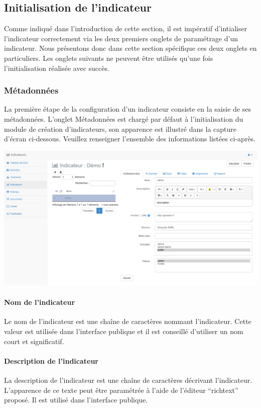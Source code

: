 \documentclass[letterpaper,10pt,french]{sphinxmanual}
\begin{document}
\subsection{Initialisation de l'indicateur}
\label{indicators/indicatorspanel:initialisation-de-l-indicateur}
Comme indiqué dans l'introduction de cette section, il est impératif
d'intialiser l'indicateur correctement via les deux premiers onglets de
paramétrage d'un indicateur. Nous présentons donc dans cette section
spécifique ces deux onglets en particuliers. Les onglets suivants ne
peuvent être utilisés qu'une fois l'initialisation réalisée avec succès.


\subsubsection{Métadonnées}
\label{indicators/indicatorspanel:metadonnees}
La première étape de la configuration d'un indicateur consiste en la
saisie de ses métadonnées. L'onglet Métadonnées est chargé par défaut
à l'initialisation du module de création d'indicateurs, son apparence
est illustré dans la capture d'écran ci-dessous. Veuillez
renseigner l'ensemble des informations listées ci-après.

\includegraphics[width=1.000\linewidth]{indicator-metadata.png}


\paragraph{Nom de l'indicateur}
\label{indicators/indicatorspanel:nom-de-l-indicateur}
Le nom de l'indicateur est une chaîne de caractères nommant l'indicateur. Cette valeur est utilisée dans l'interface publique et il est conseillé d'utiliser un nom court et significatif.


\paragraph{Description de l'indicateur}
\label{indicators/indicatorspanel:description-de-l-indicateur}
La description de l'indicateur est une chaîne de caractères décrivant l'indicateur. L'apparence de ce texte peut être paramétrée à l'aide de l'éditeur ``richtext'' proposé. Il est utilisé dans l'interface publique.
\end{document}
